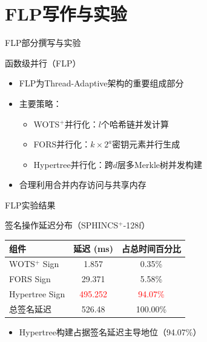 \documentclass{beamer}
\begin{document}
\section{FLP写作与实验}
\begin{frame}{FLP部分撰写与实验}
  \begin{block}{函数级并行（FLP）}
    \begin{itemize}
      \item FLP为Thread-Adaptive架构的重要组成部分
      \item 主要策略：
        \begin{itemize}
          \item WOTS$^+$并行化：$l$个哈希链并发计算
          \item FORS并行化：$k \times 2^a$密钥元素并行生成
          \item Hypertree并行化：跨$d$层多Merkle树并发构建
        \end{itemize}
      \item 合理利用合并内存访问与共享内存
    \end{itemize}
  \end{block}
\end{frame}

\begin{frame}{FLP实验结果}
  \begin{block}{签名操作延迟分布（SPHINCS$^+$-128f）}
    \begin{center}
      \scriptsize
      \begin{tabular}{lcc}
        \toprule
        \textbf{组件} & \textbf{延迟 (ms)} & \textbf{占总时间百分比} \\
        \midrule
        WOTS$^+$ Sign & 1.857 & 0.35\% \\
        FORS Sign & 29.371 & 5.58\% \\
        Hypertree Sign & \textcolor{red}{495.252} & \textcolor{red}{94.07\%} \\
        \midrule
        总签名延迟 & 526.48 & 100.00\% \\
        \bottomrule
      \end{tabular}
    \end{center}
  \end{block}
  \begin{itemize}
    \item Hypertree构建占据签名延迟主导地位（94.07\%）
  \end{itemize}
\end{frame}
\end{document}
